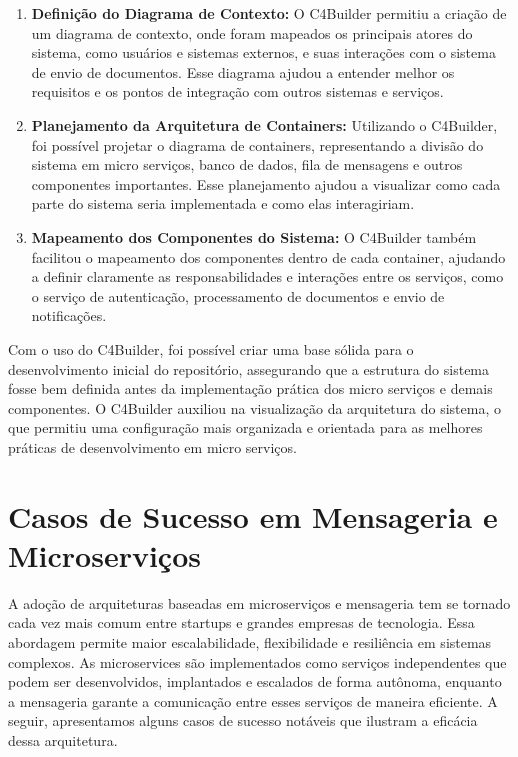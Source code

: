 \begin{enumerate}
    \item \textbf{Definição do Diagrama de Contexto:} O C4Builder permitiu a criação de um diagrama de contexto, onde foram mapeados os principais atores do sistema, como usuários e sistemas externos, e suas interações com o sistema de envio de documentos. Esse diagrama ajudou a entender melhor os requisitos e os pontos de integração com outros sistemas e serviços.

    \item \textbf{Planejamento da Arquitetura de Containers:} Utilizando o C4Builder, foi possível projetar o diagrama de containers, representando a divisão do sistema em micro serviços, banco de dados, fila de mensagens e outros componentes importantes. Esse planejamento ajudou a visualizar como cada parte do sistema seria implementada e como elas interagiriam.

    \item \textbf{Mapeamento dos Componentes do Sistema:} O C4Builder também facilitou o mapeamento dos componentes dentro de cada container, ajudando a definir claramente as responsabilidades e interações entre os serviços, como o serviço de autenticação, processamento de documentos e envio de notificações.
\end{enumerate}

Com o uso do C4Builder, foi possível criar uma base sólida para o desenvolvimento inicial do repositório, assegurando que a estrutura do sistema fosse bem definida antes da implementação prática dos micro serviços e demais componentes. O C4Builder auxiliou na visualização da arquitetura do sistema, o que permitiu uma configuração mais organizada e orientada para as melhores práticas de desenvolvimento em micro serviços.


\section{Casos de Sucesso em Mensageria e Microserviços}

A adoção de arquiteturas baseadas em microserviços e mensageria tem se tornado cada vez mais comum entre startups e grandes empresas de tecnologia. Essa abordagem permite maior escalabilidade, flexibilidade e resiliência em sistemas complexos. As microservices são implementados como serviços independentes que podem ser desenvolvidos, implantados e escalados de forma autônoma, enquanto a mensageria garante a comunicação entre esses serviços de maneira eficiente. A seguir, apresentamos alguns casos de sucesso notáveis que ilustram a eficácia dessa arquitetura.

